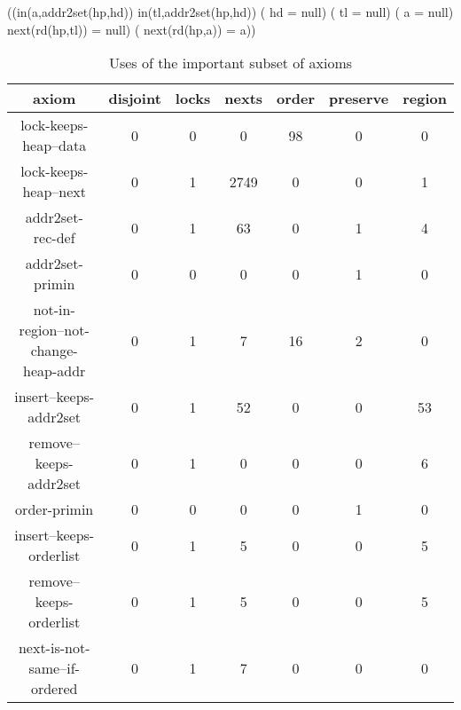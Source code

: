 	\begin{axiomdescription}
		\label{ax::next_is_not_same__if_ordered}
		\begin{formula}
			((in(a,addr2set(hp,hd)) \wedge in(tl,addr2set(hp,hd)) \wedge (\neg\;  hd = null) \wedge (\neg\;  tl = null) \wedge (\neg\;  a = null) \wedge next(rd(hp,tl)) = null) \implies (\neg\;  next(rd(hp,a)) = a))
		\end{formula}
	\end{axiomdescription}


\begin{table}
        \centering
        \begin{tabular}{c|cccccc}
        axiom & disjoint & locks & nexts & order & preserve & region 
        \\\hline
                lock-keeps-heap--data & 0 & 0 & 0 & 98 & 0 & 0 
                \\
                lock-keeps-heap--next & 0 & 1 & 2749 & 0 & 0 & 1 
                \\
                addr2set-rec-def & 0 & 1 & 63 & 0 & 1 & 4 
                \\
                addr2set-primin & 0 & 0 & 0 & 0 & 1 & 0 
                \\
                not-in-region--not-change-heap-addr & 0 & 1 & 7 & 16 & 2 & 0 
                \\
                insert--keeps-addr2set & 0 & 1 & 52 & 0 & 0 & 53 
                \\
                remove--keeps-addr2set & 0 & 1 & 0 & 0 & 0 & 6 
                \\
  	            order-primin & 0 & 0 & 0 & 0 & 1 & 0 
                \\
                insert--keeps-orderlist & 0 & 1 & 5 & 0 & 0 & 5
                \\
                remove--keeps-orderlist & 0 & 1 & 5 & 0 & 0 & 5 
                \\
                next-is-not-same--if-ordered & 0 & 1 & 7 & 0 & 0 & 0 
                \\
        \end{tabular}
\label{table:axiom_important}
\caption{Uses of the important subset of axioms}
\end{table}


